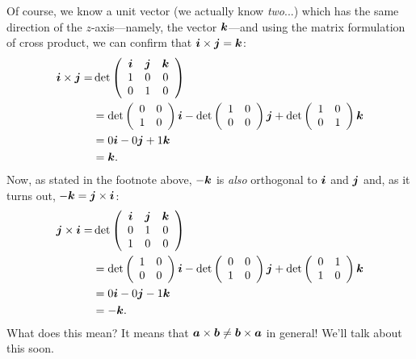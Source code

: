 \documentclass[12pt]{article}
\begin{document}
	Of course, we know a unit vector (we actually know \textit{two}...) which has the same direction of the $z$-axis---namely, the vector $\boldsymbol{k}$---and using the matrix formulation of cross product, we can confirm that $\boldsymbol{i}\times\boldsymbol{j}=\boldsymbol{k}$:
	\begin{align*}
		\boldsymbol{i}\times\boldsymbol{j}=
		& \det\left(\begin{array}{ccc}\boldsymbol{i} & \boldsymbol{j} & \boldsymbol{k}\\ 1 & 0 & 0\\0 & 1 & 0\end{array}\right)\\
		& = \det\left(\begin{array}{cc} 0 & 0\\ 1 & 0\end{array}\right)\boldsymbol{i}-\det\left(\begin{array}{cc} 1 & 0\\ 0 & 0\end{array}\right)\boldsymbol{j}+\det\left(\begin{array}{cc} 1 & 0\\ 0 & 1\end{array}\right)\boldsymbol{k}\\
		& = 0\boldsymbol{i}-0\boldsymbol{j}+1\boldsymbol{k}\\
		& = \boldsymbol{k}.
	\end{align*}
	Now, as stated in the footnote above, $-\boldsymbol{k}$ is \textit{also} orthogonal to $\boldsymbol{i}$ and $\boldsymbol{j}$ and, as it turns out, $-\boldsymbol{k}=\boldsymbol{j}\times\boldsymbol{i}$:
	\begin{align*}
		\boldsymbol{j}\times\boldsymbol{i}=
		& \det\left(\begin{array}{ccc}\boldsymbol{i} & \boldsymbol{j} & \boldsymbol{k}\\ 0 & 1 & 0 \\1 & 0 & 0\end{array}\right)\\
		& = \det\left(\begin{array}{cc} 1 & 0\\ 0 & 0\end{array}\right)\boldsymbol{i}-\det\left(\begin{array}{cc} 0 & 0\\ 1 & 0\end{array}\right)\boldsymbol{j}+\det\left(\begin{array}{cc} 0 & 1\\ 1 & 0\end{array}\right)\boldsymbol{k}\\
		& = 0\boldsymbol{i}-0\boldsymbol{j}-1\boldsymbol{k}\\
		& = -\boldsymbol{k}.
	\end{align*}
	What does this mean? It means that $\boldsymbol{a}\times\boldsymbol{b}\neq\boldsymbol{b}\times\boldsymbol{a}$ in general! We'll talk about this soon.
	
\end{document}
